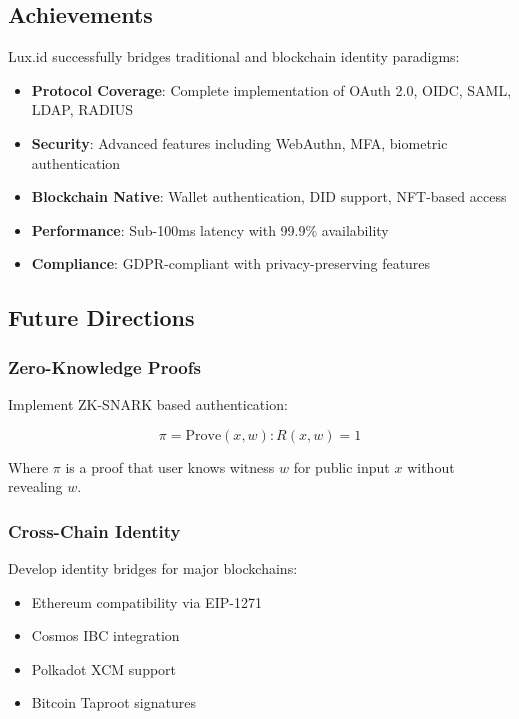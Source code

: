 \documentclass[11pt,a4paper]{article}
\begin{document}
\subsection{Achievements}

Lux.id successfully bridges traditional and blockchain identity paradigms:

\begin{itemize}
    \item \textbf{Protocol Coverage}: Complete implementation of OAuth 2.0, OIDC, SAML, LDAP, RADIUS
    \item \textbf{Security}: Advanced features including WebAuthn, MFA, biometric authentication
    \item \textbf{Blockchain Native}: Wallet authentication, DID support, NFT-based access
    \item \textbf{Performance}: Sub-100ms latency with 99.9\% availability
    \item \textbf{Compliance}: GDPR-compliant with privacy-preserving features
\end{itemize}

\subsection{Future Directions}

\subsubsection{Zero-Knowledge Proofs}

Implement ZK-SNARK based authentication:

\begin{equation}
    \pi = \text{Prove}(x, w) : R(x, w) = 1
\end{equation}

Where $\pi$ is a proof that user knows witness $w$ for public input $x$ without revealing $w$.

\subsubsection{Cross-Chain Identity}

Develop identity bridges for major blockchains:
\begin{itemize}
    \item Ethereum compatibility via EIP-1271
    \item Cosmos IBC integration
    \item Polkadot XCM support
    \item Bitcoin Taproot signatures
\end{itemize}
\end{document}
